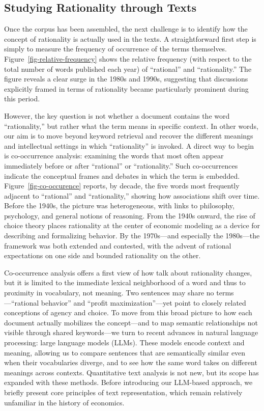 \documentclass[
]{interact}
\begin{document}
\subsection{Studying Rationality through
Texts}\label{studying-rationality-through-texts}

Once the corpus has been assembled, the next challenge is to identify
how the concept of rationality is actually used in the texts. A
straightforward first step is simply to measure the frequency of
occurrence of the terms themselves. Figure~\ref{fig-relative-frequency}
shows the relative frequency (with respect to the total number of words
published each year) of ``rational'' and ``rationality.'' The figure
reveals a clear surge in the 1980s and 1990s, suggesting that
discussions explicitly framed in terms of rationality became
particularly prominent during this period.

However, the key question is not whether a document contains the word
``rationality,'' but rather what the term means in specific context. In
other words, our aim is to move beyond keyword retrieval and recover the
different meanings and intellectual settings in which ``rationality'' is
invoked. A direct way to begin is co-occurrence analysis: examining the
words that most often appear immediately before or after ``rational'' or
``rationality.'' Such co-occurrences indicate the conceptual frames and
debates in which the term is embedded. Figure~\ref{fig-co-occurence}
reports, by decade, the five words most frequently adjacent to
``rational'' and ``rationality,'' showing how associations shift over
time. Before the 1940s, the picture was heterogeneous, with links to
philosophy, psychology, and general notions of reasoning. From the 1940s
onward, the rise of choice theory places rationality at the center of
economic modeling as a device for describing and formalizing behavior.
By the 1970s---and especially the 1980s---the framework was both
extended and contested, with the advent of rational expectations on one
side and bounded rationality on the other.

Co-occurrence analysis offers a first view of how talk about rationality
changes, but it is limited to the immediate lexical neighborhood of a
word and thus to proximity in vocabulary, not meaning. Two sentences may
share no terms---``rational behavior'' and ``profit maximization''---yet
point to closely related conceptions of agency and choice. To move from
this broad picture to how each document actually mobilizes the
concept---and to map semantic relationships not visible through shared
keywords---we turn to recent advances in natural language processing:
large language models (LLMs). These models encode context and meaning,
allowing us to compare sentences that are semantically similar even when
their vocabularies diverge, and to see how the same word takes on
different meanings across contexts. Quantitative text analysis is not
new, but its scope has expanded with these methods. Before introducing
our LLM-based approach, we briefly present core principles of text
representation, which remain relatively unfamiliar in the history of
economics.
\end{document}
